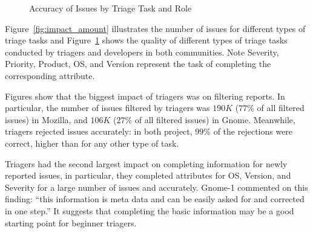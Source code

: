 \documentclass[conference]{IEEEtran}
\begin{document}
\begin{figure}[t]
\begin{centering}
\vspace{-0.2in}
\end{centering}
\vspace{-0in}\caption{Accuracy of Issues by Triage Task and Role}
\label{fig:impact_quality}
\vspace{-0.3in}
\end{figure}

Figure~\ref{fig:impact_amount} illustrates the number of issues for
different types of triage tasks and Figure~\ref{fig:impact_quality}
shows the quality of different types of triage tasks conducted by
triagers and developers in both communities.
Note Severity, Priority, Product, OS, and Version
represent the task of completing the corresponding
attribute.

\begin{comment}
\begin{table*}[ht]
\centering
\caption{Issues by triage task and role}\label{tab:field}
\begin{tabular}{|r|r|r|r|r|r|r|r|}
\hline
Project& Role & Rejected & Confirmed &  Severity & Priority & Version & OS & Product \\
  \hline
Gnome &  Triager & 71K & 36K & 38K & 37K & 38K & 36K & 37K  \\
  Developer & 184K & 92K & 97K & 96K & 102K& 93K & 98K  \\
  \hline
  \hline
Mozilla&   Triager & 116K & 54K & 172K & 170K & 177K & 171K & 64K \\
 & Developer & 33K & 11K & 45K & 44K & 48K & 45K & 16K \\
  \hline
\end{tabular}
\end{table*}
\end{comment}

Figures show that the biggest impact of triagers was on filtering reports.
In particular, the number of issues
filtered by triagers was $190K$ ($77$\% of all filtered issues) in Mozilla, and $106K$
($27$\% of all filtered issues) in Gnome. Meanwhile, triagers rejected issues
accurately: in both project, $99$\% of the rejections were correct, higher than
for any other type of task.



Triagers had the second largest impact on completing information for
newly reported issues, in particular, they completed attributes for
OS, Version, and Severity for a large number of issues and
accurately.  Gnome-1 commented on this finding: ``this
  information is meta data and can be easily asked for and corrected
  in one step.'' It suggests that completing the basic information
may be a good starting point for beginner triagers.
\end{document}
